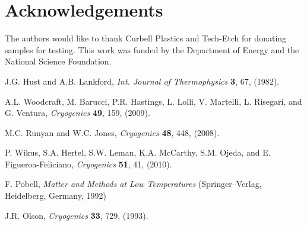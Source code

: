 \documentclass[final]{svjour2}
\begin{document}
\section{Acknowledgements}
The authors would like to thank Curbell Plastics and Tech-Etch for donating samples for testing. This work was funded by the Department of Energy and the National Science Foundation.

\begin{thebibliography}{99}

J.G. Hust and A.B. Lankford, {\it Int. Journal of Thermophysics} \textbf{3}, 67, (1982).

A.L. Woodcraft, M. Barucci, P.R. Hastings, L. Lolli, V. Martelli, L. Risegari, and G. Ventura, {\it Cryogenics} \textbf{49}, 159, (2009).

M.C. Runyan and W.C. Jones, {\it Cryogenics} \textbf{48}, 448, (2008).

P. Wikus, S.A. Hertel, S.W. Leman, K.A. Mc{C}arthy, S.M. Ojeda, and E. Figueroa-{F}eliciano, {\it Cryogenics} \textbf{51}, 41, (2010).

F. Pobell, {\it Matter and Methods at Low Temperatures} (Springer--Verlag, Heidelberg, Germany, 1992)

J.R. Olson, {\it Cryogenics} \textbf{33}, 729, (1993).

\end{thebibliography}
\end{document}
